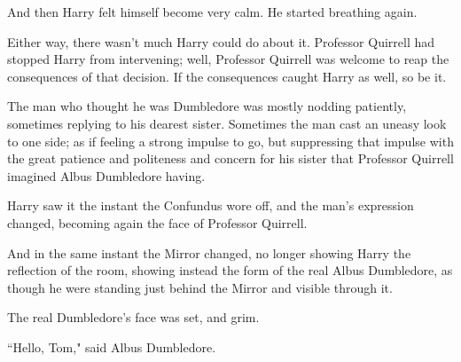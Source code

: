 And then Harry felt himself become very calm. He started breathing again.

Either way, there wasn't much Harry could do about it. Professor Quirrell had stopped Harry from intervening; well, Professor Quirrell was welcome to reap the consequences of that decision. If the consequences caught Harry as well, so be it.

The man who thought he was Dumbledore was mostly nodding patiently, sometimes replying to his dearest sister. Sometimes the man cast an uneasy look to one side; as if feeling a strong impulse to go, but suppressing that impulse with the great patience and politeness and concern for his sister that Professor Quirrell imagined Albus Dumbledore having.

Harry saw it the instant the Confundus wore off, and the man's expression changed, becoming again the face of Professor Quirrell.

And in the same instant the Mirror changed, no longer showing Harry the reflection of the room, showing instead the form of the real Albus Dumbledore, as though he were standing just behind the Mirror and visible through it.

The real Dumbledore's face was set, and grim.

``Hello, Tom," said Albus Dumbledore.

